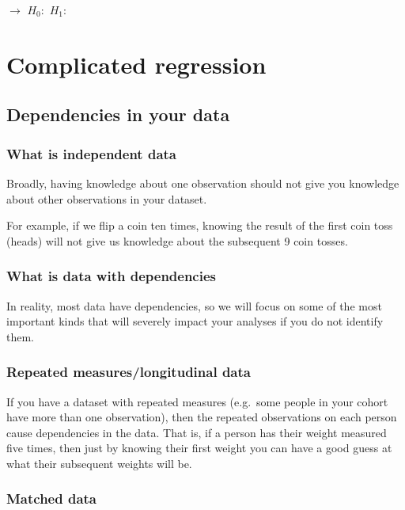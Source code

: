 \documentclass[12pt,]{article}
\begin{document}
\(\rightarrow\) \hfill \break
\hfill \break
\hfill \break
\hfill \break
\hfill \break
\hfill \break
\(H_0:\) \hfill \break
\hfill \break
\hfill \break
\(H_1:\)

\section{Complicated regression}\label{complicated-regression}

\subsection{Dependencies in your data}\label{dependencies-in-your-data}

\subsubsection{What is independent data}\label{what-is-independent-data}

Broadly, having knowledge about one observation should not give you
knowledge about other observations in your dataset.

For example, if we flip a coin ten times, knowing the result of the
first coin toss (heads) will not give us knowledge about the subsequent
9 coin tosses.

\subsubsection{What is data with
dependencies}\label{what-is-data-with-dependencies}

In reality, most data have dependencies, so we will focus on some of the
most important kinds that will severely impact your analyses if you do
not identify them.

\subsubsection{Repeated measures/longitudinal
data}\label{repeated-measureslongitudinal-data}

If you have a dataset with repeated measures (e.g.~some people in your
cohort have more than one observation), then the repeated observations
on each person cause dependencies in the data. That is, if a person has
their weight measured five times, then just by knowing their first
weight you can have a good guess at what their subsequent weights will
be.

\subsubsection{Matched data}\label{matched-data}
\end{document}
